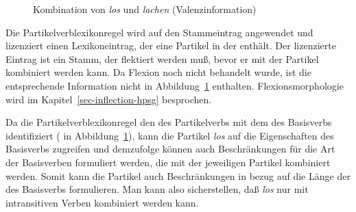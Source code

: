 \begin{figure}[htbp]
\begin{center}
\end{center}
\caption{Kombination von {\em los} und {\em lachen} (Valenzinformation)}\label{fig-loslachen-val}
\end{figure}

\noindent
Die Partikelverblexikonregel wird auf den Stammeintrag   angewendet
und lizenziert einen Lexikoneintrag, der eine Partikel in der \subcatl enthält.
Der lizenzierte Eintrag ist ein Stamm, der flektiert werden muß, bevor
er mit der Partikel kombiniert werden kann. Da Flexion noch nicht behandelt
wurde, ist die entsprechende Information nicht in Abbildung~\ref{fig-loslachen-val}
enthalten. Flexionsmorphologie wird im Kapitel~\ref{sec-inflection-hpsg} besprochen.
%

Da die Partikelverblexikonregel den \modw des Partikelverbs mit dem \synsemw
des Basisverbs identifiziert ( in Abbildung~\ref{fig-loslachen-val}),
kann die Partikel \emph{los} auf die Eigenschaften des Basisverbs zugreifen
und demzufolge können auch Beschränkungen für die Art der Basisverben formuliert
werden, die mit der jeweiligen Partikel kombiniert werden.
Somit kann die Partikel auch Beschränkungen in bezug auf die Länge
der \subcatl des Basisverbs formulieren. Man kann also sicherstellen, daß
\emph{los} nur mit intransitiven Verben kombiniert werden kann.

